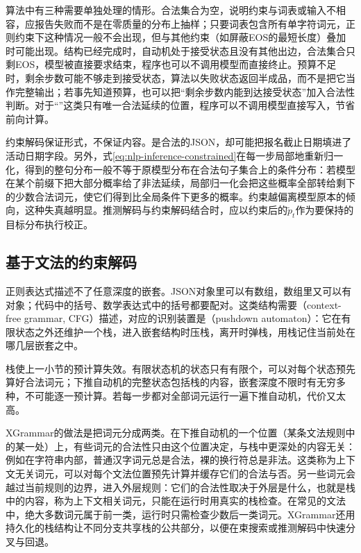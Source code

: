 算法中有三种需要单独处理的情形。合法集合为空，说明约束与词表或输入不相容，应报告失败而不是在零质量的分布上抽样；只要词表包含所有单字符词元，正则约束下这种情况一般不会出现，但与其他约束（如屏蔽EOS的最短长度）叠加时可能出现。结构已经完成时，自动机处于接受状态且没有其他出边，合法集合只剩EOS，模型被直接要求结束，程序也可以不调用模型而直接终止。预算不足时，剩余步数可能不够走到接受状态，算法以失败状态返回半成品，而不是把它当作完整输出；若事先知道预算，也可以把“剩余步数内能到达接受状态”加入合法性判断。对于“”这类只有唯一合法延续的位置，程序可以不调用模型直接写入，节省前向计算。

约束解码保证形式，不保证内容。是合法的JSON，却可能把报名截止日期填进了活动日期字段。另外，式\eqref{eq:nlp-inference-constrained}在每一步局部地重新归一化，得到的整句分布一般不等于原模型分布在合法句子集合上的条件分布：若模型在某个前缀下把大部分概率给了非法延续，局部归一化会把这些概率全部转给剩下的少数合法词元，使它们得到比全局条件下更多的概率。约束越偏离模型原本的倾向，这种失真越明显。推测解码与约束解码结合时，应以约束后的$\tilde p_t$作为要保持的目标分布执行校正。

\subsection{基于文法的约束解码}
\label{sec:nlp-inference-grammar}

正则表达式描述不了任意深度的嵌套。JSON对象里可以有数组，数组里又可以有对象；代码中的括号、数学表达式中的括号都要配对。这类结构需要（context-free grammar, CFG）描述，对应的识别装置是（pushdown automaton）：它在有限状态之外还维护一个栈，进入嵌套结构时压栈，离开时弹栈，用栈记住当前处在哪几层嵌套之中。

栈使上一小节的预计算失效。有限状态机的状态只有有限个，可以对每个状态预先算好合法词元；下推自动机的完整状态包括栈的内容，嵌套深度不限时有无穷多种，不可能逐一预计算。若每一步都对全部词元运行一遍下推自动机，代价又太高。

XGrammar的做法是把词元分成两类。在下推自动机的一个位置（某条文法规则中的某一处）上，有些词元的合法性只由这个位置决定，与栈中更深处的内容无关：例如在字符串内部，普通汉字词元总是合法，裸的换行符总是非法。这类称为上下文无关词元，可以对每个文法位置预先计算并缓存它们的合法与否。另一些词元会越过当前规则的边界，进入外层规则：它们的合法性取决于外层是什么，也就是栈中的内容，称为上下文相关词元，只能在运行时用真实的栈检查。在常见的文法中，绝大多数词元属于前一类，运行时只需检查少数后一类词元。XGrammar还用持久化的栈结构让不同分支共享栈的公共部分，以便在束搜索或推测解码中快速分叉与回退。

